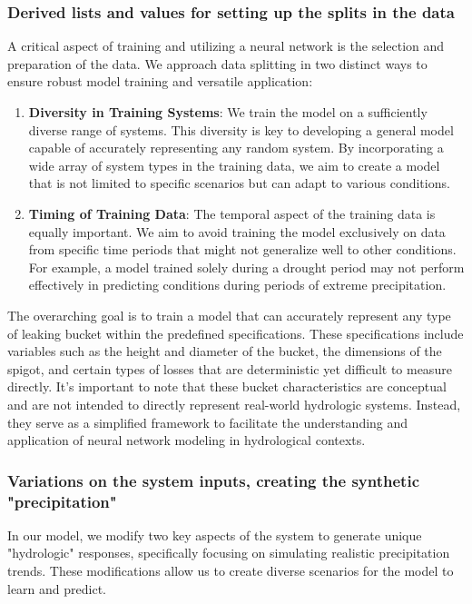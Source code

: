 \documentclass{article}
\begin{document}
\subsubsection{Derived lists and values for setting up the splits in the data}
A critical aspect of training and utilizing a neural network is the selection and preparation of the data. We approach data splitting in two distinct ways to ensure robust model training and versatile application:

\begin{enumerate}

\item \textbf{Diversity in Training Systems}: We train the model on a sufficiently diverse range of systems. This diversity is key to developing a general model capable of accurately representing any random system. By incorporating a wide array of system types in the training data, we aim to create a model that is not limited to specific scenarios but can adapt to various conditions.

\item \textbf{Timing of Training Data}: The temporal aspect of the training data is equally important. We aim to avoid training the model exclusively on data from specific time periods that might not generalize well to other conditions. For example, a model trained solely during a drought period may not perform effectively in predicting conditions during periods of extreme precipitation.

\end{enumerate}

The overarching goal is to train a model that can accurately represent any type of leaking bucket within the predefined specifications. These specifications include variables such as the height and diameter of the bucket, the dimensions of the spigot, and certain types of losses that are deterministic yet difficult to measure directly. It's important to note that these bucket characteristics are conceptual and are not intended to directly represent real-world hydrologic systems. Instead, they serve as a simplified framework to facilitate the understanding and application of neural network modeling in hydrological contexts.

\subsubsection{Variations on the system inputs, creating the synthetic "precipitation"}
\label{methods:synthetic_inputs}
In our model, we modify two key aspects of the system to generate unique "hydrologic" responses, specifically focusing on simulating realistic precipitation trends. These modifications allow us to create diverse scenarios for the model to learn and predict.
\end{document}
